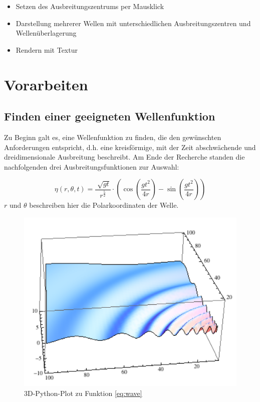\documentclass[conference]{IEEEtran}
\begin{document}
\begin{itemize}
\item Setzen des Ausbreitungszentrums per Mausklick
\item Darstellung mehrerer Wellen mit unterschiedlichen Ausbreitungszentren und Wellen\"uberlagerung
\item Rendern mit Textur
\end{itemize}

\section{Vorarbeiten}

\subsection{Finden einer geeigneten Wellenfunktion}
Zu Beginn galt es, eine Wellenfunktion zu finden, die den gew\"unschten Anforderungen entspricht, d.h. eine kreisf\"ormige, mit der Zeit abschw\"achende und dreidimensionale Ausbreitung beschreibt. Am Ende der Recherche standen die nachfolgenden drei Ausbreitungsfunktionen zur Auswahl:

\begin{equation}\label{eq:wave}
\eta(r, \theta, t) = \frac{\sqrt[]{gt}}{r^{\frac{5}{2}}} \cdot (\cos(\frac{gt^{2}}{4r}) - \sin(\frac{gt^{2}}{4r}))
\end{equation}
$r$ und $\theta$ beschreiben hier die Polarkoordinaten der Welle.

\begin{figure}[H]
\centerline{\includegraphics[scale=0.25]{img/wave1.png}}
\label{fig:wave}
\caption{3D-Python-Plot zu Funktion \eqref{eq:wave}}
\end{figure}
\end{document}
